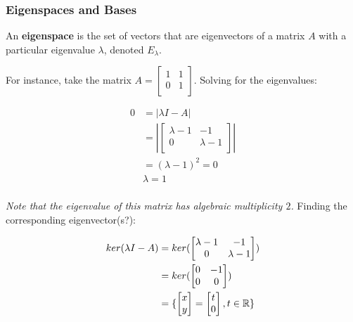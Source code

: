 \documentclass[12pt]{article}
\begin{document}
{\subsubsection{Eigenspaces and Bases}

An \textbf{eigenspace} is the set of vectors that are eigenvectors of a matrix $A$ with a particular eigenvalue $\lambda$, denoted $E_{\lambda}$. 

For instance, take the matrix $A = \begin{bmatrix}
    1 & 1\\
    0 & 1\\
\end{bmatrix}$. Solving for the eigenvalues:

\begin{align*}
    0 &= |\lambda I - A|\\
    &= |\begin{bmatrix}
        \lambda-1 & -1\\
        0 & \lambda-1\\
    \end{bmatrix}|\\
    &= (\lambda-1)^2 = 0\\
    &\lambda = 1\\
\end{align*}

\textit{Note that the eigenvalue of this matrix has algebraic multiplicity $2$.} Finding the corresponding eigenvector(s?):

\begin{align*}
    ker(\lambda I - A) &= ker(\begin{bmatrix}
        \lambda - 1 & -1\\
        0 & \lambda-1\\
    \end{bmatrix})\\
    &= ker(\begin{bmatrix}
        0 & -1\\
        0 & 0\\
    \end{bmatrix})\\
    &= \{\begin{bmatrix}
        x\\
        y
    \end{bmatrix} = \begin{bmatrix}
        t\\
        0
    \end{bmatrix}, t \in \mathbb{R} \}
\end{align*}

}
\end{document}
